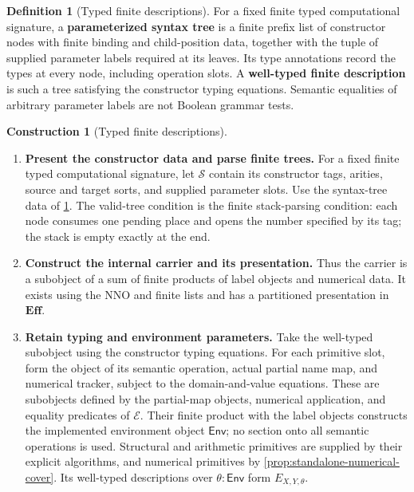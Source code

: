 \documentclass[11pt,a4paper]{article}
\numberwithin{algorithm}{section}
\numberwithin{equation}{section}
\theoremstyle{definition}
\newtheorem{definition}[definition]{Definition}
\theoremstyle{remark}
\theoremstyle{plain}
\newcommand{\E}{\mathcal E}
\newcommand{\Env}{\mathsf{Env}}
\newcommand{\Eff}{\mathbf{Eff}}
\theoremstyle{definition}
\newtheorem{construction}[construction]{Construction}
\theoremstyle{plain}
\begin{document}
\begin{definition}[Typed finite descriptions]\label{def:typed-finite-descriptions}
For a fixed finite typed computational signature, a
\textbf{parameterized syntax tree} is a finite prefix list of
constructor nodes with finite binding and child-position data,
together with the tuple of supplied parameter labels required at
its leaves. Its type annotations record the types at every node,
including operation slots. A \textbf{well-typed finite description}
is such a tree satisfying the constructor typing equations.
Semantic equalities of arbitrary parameter labels are not Boolean
grammar tests.
\end{definition}

\begin{construction}[Typed finite descriptions]\label{constr:standalone-syntax}\leavevmode
\begin{enumerate}[leftmargin=*,align=left]
\item \textbf{Present the constructor data and parse finite trees.}
For a fixed finite typed computational signature, let $\mathcal S$
contain its constructor tags, arities, source and target sorts,
and supplied parameter slots. Use the syntax-tree data of \cref{def:typed-finite-descriptions}. The valid-tree condition is the
finite stack-parsing condition: each node consumes one pending place
and opens the number specified by its tag; the stack is empty
exactly at the end.

\item \textbf{Construct the internal carrier and its presentation.}
Thus the carrier is a subobject of a sum of
finite products of label objects and numerical data. It exists
using the NNO and finite lists and has a partitioned presentation
in $\Eff$.

\item \textbf{Retain typing and environment parameters.}
Take the well-typed subobject using the constructor typing equations.
For each primitive slot, form the object of its semantic operation,
actual partial name map, and numerical tracker, subject to the
domain-and-value equations. These are subobjects defined by the
partial-map objects, numerical application, and equality predicates
of $\E$. Their finite product with the label objects constructs
the implemented environment object $\Env$; no section onto all
semantic operations is used. Structural and arithmetic primitives
are supplied by their explicit algorithms, and numerical primitives
by \cref{prop:standalone-numerical-cover}. Its well-typed
descriptions over $\theta:\Env$ form $E_{X,Y,\theta}$.
\end{enumerate}
\end{construction}
\end{document}

